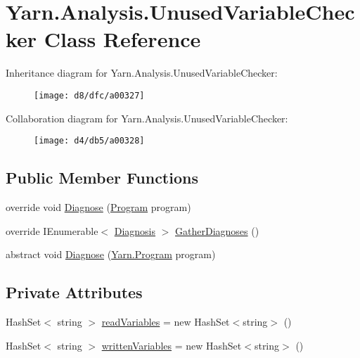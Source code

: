 \hypertarget{a00084}{\section{Yarn.\-Analysis.\-Unused\-Variable\-Checker Class Reference}
\label{a00084}
}


Inheritance diagram for Yarn.\-Analysis.\-Unused\-Variable\-Checker\-:
\nopagebreak
\begin{figure}[H]
\begin{center}
\leavevmode
\texttt{[image: d8/dfc/a00327]}
\end{center}
\end{figure}


Collaboration diagram for Yarn.\-Analysis.\-Unused\-Variable\-Checker\-:
\nopagebreak
\begin{figure}[H]
\begin{center}
\leavevmode
\texttt{[image: d4/db5/a00328]}
\end{center}
\end{figure}
\subsection*{Public Member Functions}
\begin{DoxyCompactItemize}
\item 
override void \hyperlink{a00084_aeac8f333d4dcc85f4d4a716bf8fea01f}{Diagnose} (\hyperlink{a00067}{Program} program)
\item 
override I\-Enumerable$<$ \hyperlink{a00035}{Diagnosis} $>$ \hyperlink{a00084_a107aecf707b130c4b733930a95f9154e}{Gather\-Diagnoses} ()
\item 
abstract void \hyperlink{a00028_aba4a36cb823b11ee491074e26477d084}{Diagnose} (\hyperlink{a00067}{Yarn.\-Program} program)
\end{DoxyCompactItemize}
\subsection*{Private Attributes}
\begin{DoxyCompactItemize}
\item 
Hash\-Set$<$ string $>$ \hyperlink{a00084_a6b542092ddce1b92c9455d60899518a9}{read\-Variables} = new Hash\-Set$<$string$>$ ()
\item 
Hash\-Set$<$ string $>$ \hyperlink{a00084_a0c2fe6eded1b10b135ca2469f5980a39}{written\-Variables} = new Hash\-Set$<$string$>$ ()
\end{DoxyCompactItemize}


